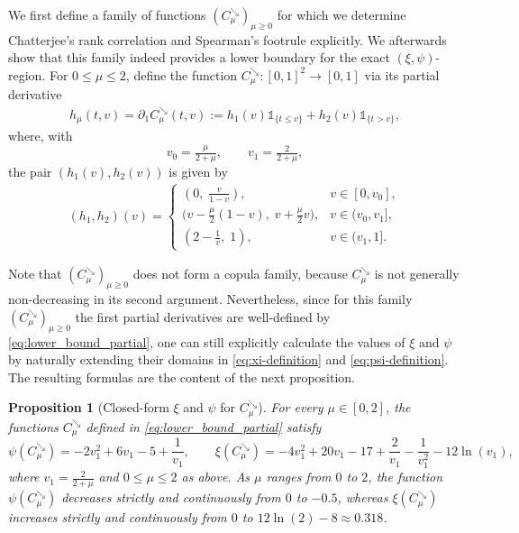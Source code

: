 \documentclass{article}
\newtheorem{proposition}[theorem]{Proposition}
\newcommand{\1}{\mathds{1}}
\begin{document}
We first define a family of functions $(C^{\searrow}_\mu)_{\mu\ge 0}$ for which we determine Chatterjee's rank correlation and Spearman's footrule explicitly.
We afterwards show that this family indeed provides a lower boundary for the exact $(\xi,\psi)$-region.
For $0\le\mu \le 2$, define the function $C^{\searrow}_\mu : [0,1]^2 \to [0,1]$ via its partial derivative
\begin{align}\label{eq:lower_bound_partial}
    h_\mu(t,v)
    = \partial_1 C^{\searrow}_\mu(t,v)
    := h_1(v)\1_{\{t \le v\}} + h_2(v)\1_{\{t > v\}},
\end{align}
where, with 
\[
    v_0 = \tfrac{\mu}{2+\mu}, 
    \qquad v_1 = \tfrac{2}{2+\mu},
\]
the pair $(h_1(v),h_2(v))$ is given by
\begin{align}\label{eq:lower_bound_h1h2}
    (h_1,h_2)(v) =
    \begin{cases}
        (0,\; \tfrac{v}{1-v}), & v \in [0,v_0], \\[6pt]
        \bigl(v - \tfrac{\mu}{2}(1-v),\; v + \tfrac{\mu}{2}v\bigr), & v \in (v_0,v_1], \\[6pt]
        (2 - \tfrac{1}{v},\; 1), & v \in (v_1,1].
    \end{cases}
\end{align}

Note that $(C^{\searrow}_\mu)_{\mu\ge 0}$ does not form a copula family, because $C^{\searrow}_\mu$ is not generally non-decreasing in its second argument.
Nevertheless, since for this family $(C^{\searrow}_\mu)_{\mu\ge 0}$ the first partial derivatives are well-defined by \eqref{eq:lower_bound_partial}, one can still explicitly calculate the values of $\xi$ and $\psi$ by naturally extending their domains in \eqref{eq:xi-definition} and \eqref{eq:psi-definition}.
The resulting formulas are the content of the next proposition.

\begin{proposition}[Closed-form $\xi$ and $\psi$ for $C^{\searrow}_\mu$]
    \label{prop:compact_formulas}
For every $\mu \in [0,2]$, the functions $C^{\searrow}_\mu$ defined in \eqref{eq:lower_bound_partial} satisfy
\[
    \psi(C^{\searrow}_\mu) = -2v_1^2 + 6v_1 - 5 + \frac{1}{v_1},
    \qquad
    \xi(C^{\searrow}_\mu) = -4v_1^2 + 20v_1 - 17 + \frac{2}{v_1} - \frac{1}{v_1^2} - 12\ln(v_1),
\]
where $v_1 = \tfrac{2}{2+\mu}$ and $0\le\mu\le 2$ as above.
As $\mu$ ranges from $0$ to $2$, the function $\psi(C^{\searrow}_\mu)$ decreases strictly and continuously from $0$ to $-0.5$, whereas $\xi(C^{\searrow}_\mu)$ increases strictly and continuously from $0$ to $12\ln(2)-8\approx0.318$.
\end{proposition}
\end{document}
